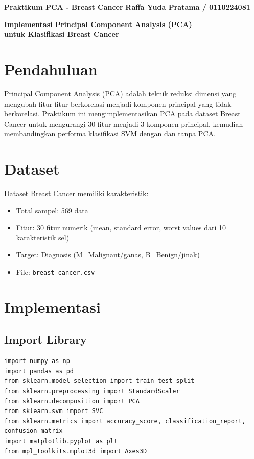 \documentclass[12pt,a4paper]{article}
\begin{document}
\noindent
\textbf{Praktikum PCA - Breast Cancer} \hfill \textbf{Raffa Yuda Pratama / 0110224081}

\vspace{1em}

\begin{center}
\textbf{\large Implementasi Principal Component Analysis (PCA)} \\
\textbf{\large untuk Klasifikasi Breast Cancer}
\end{center}

\vspace{1em}

\section{Pendahuluan}

Principal Component Analysis (PCA) adalah teknik reduksi dimensi yang mengubah fitur-fitur berkorelasi menjadi komponen principal yang tidak berkorelasi. Praktikum ini mengimplementasikan PCA pada dataset Breast Cancer untuk mengurangi 30 fitur menjadi 3 komponen principal, kemudian membandingkan performa klasifikasi SVM dengan dan tanpa PCA.

\section{Dataset}

Dataset Breast Cancer memiliki karakteristik:
\begin{itemize}
    \item Total sampel: 569 data
    \item Fitur: 30 fitur numerik (mean, standard error, worst values dari 10 karakteristik sel)
    \item Target: Diagnosis (M=Malignant/ganas, B=Benign/jinak)
    \item File: \texttt{breast\_cancer.csv}
\end{itemize}

\section{Implementasi}

\subsection{Import Library}

\begin{lstlisting}[caption=Import Library yang Diperlukan]
import numpy as np
import pandas as pd
from sklearn.model_selection import train_test_split
from sklearn.preprocessing import StandardScaler
from sklearn.decomposition import PCA
from sklearn.svm import SVC
from sklearn.metrics import accuracy_score, classification_report, confusion_matrix
import matplotlib.pyplot as plt
from mpl_toolkits.mplot3d import Axes3D
\end{lstlisting}
\end{document}
